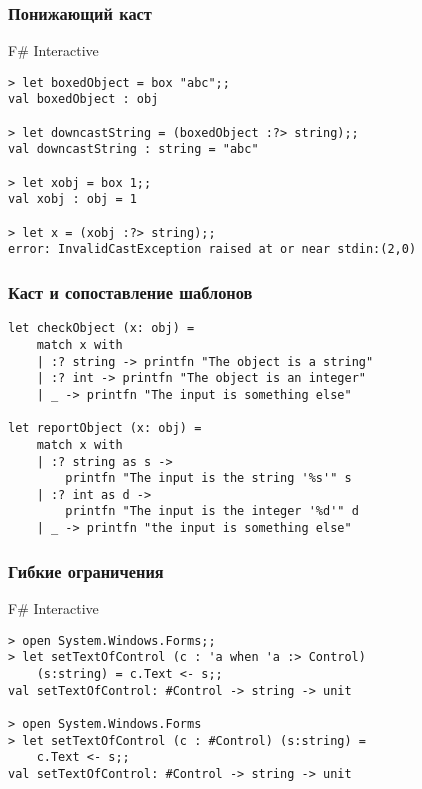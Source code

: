 \documentclass[xetex,mathserif,serif]{beamer}
\begin{document}
    \begin{frame}[fragile]
        \frametitle{Понижающий каст}
        \begin{alertblock}{F\# Interactive}
            \begin{verbatim}
> let boxedObject = box "abc";;
val boxedObject : obj

> let downcastString = (boxedObject :?> string);;
val downcastString : string = "abc"

> let xobj = box 1;;
val xobj : obj = 1

> let x = (xobj :?> string);;
error: InvalidCastException raised at or near stdin:(2,0)
            \end{verbatim}
        \end{alertblock}
    \end{frame}

    \begin{frame}[fragile]
        \frametitle{Каст и сопоставление шаблонов}
        \begin{verbatim}
let checkObject (x: obj) =
    match x with
    | :? string -> printfn "The object is a string"
    | :? int -> printfn "The object is an integer"
    | _ -> printfn "The input is something else"

let reportObject (x: obj) =
    match x with
    | :? string as s -> 
        printfn "The input is the string '%s'" s
    | :? int as d -> 
        printfn "The input is the integer '%d'" d
    | _ -> printfn "the input is something else"
        \end{verbatim}
    \end{frame}

    \begin{frame}[fragile]
        \frametitle{Гибкие ограничения}
        \begin{alertblock}{F\# Interactive}
            \begin{verbatim}
> open System.Windows.Forms;;
> let setTextOfControl (c : 'a when 'a :> Control) 
    (s:string) = c.Text <- s;;
val setTextOfControl: #Control -> string -> unit

> open System.Windows.Forms
> let setTextOfControl (c : #Control) (s:string) = 
    c.Text <- s;;
val setTextOfControl: #Control -> string -> unit
            \end{verbatim}
        \end{alertblock}
    \end{frame}
\end{document}
